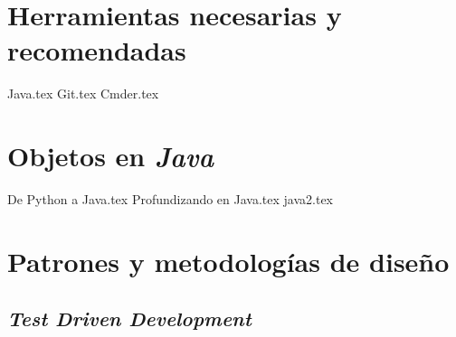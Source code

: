 \documentclass[12pt]{book}
\begin{document}
  \frontmatter
  \maketitle
  \tableofcontents
  

  \mainmatter
  \part{Herramientas necesarias y recomendadas}
    {Java.tex}
    {Git.tex}
    {Cmder.tex}
  \part{Objetos en \textit{Java}}
    
    {De Python a Java.tex}
    {Profundizando en Java.tex}
    {java2.tex}
  \part{Patrones y metodologías de diseño}
    \chapter{\textit{Test Driven Development}}
      \label{ch:tdd}
\end{document}

